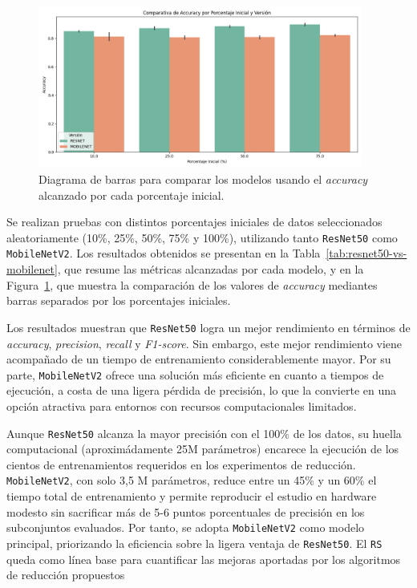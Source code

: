 \begin{figure}[htp]
    \centering
    \includegraphics[width=0.95\textwidth]{imagenes/evaluaciones/comparacion_modelos.png}
    \caption{Diagrama de barras para comparar los modelos usando el \textit{accuracy} alcanzado por cada porcentaje inicial.}
    \label{fig:comparacion_modelos}
\end{figure}

Se realizan pruebas con distintos porcentajes iniciales de datos seleccionados aleatoriamente (10\%, 25\%, 50\%, 75\% y 100\%), utilizando tanto \texttt{ResNet50} como \texttt{MobileNetV2}.
Los resultados obtenidos se presentan en la Tabla~\ref{tab:resnet50-vs-mobilenet}, que resume las métricas alcanzadas por cada modelo,
y en la Figura~\ref{fig:comparacion_modelos}, que muestra la comparación de los valores de \textit{accuracy} mediantes barras separados por los porcentajes iniciales.

Los resultados muestran que \texttt{ResNet50} logra un mejor rendimiento en términos de \textit{accuracy}, \textit{precision}, \textit{recall} y \textit{F1-score}.
Sin embargo, este mejor rendimiento viene acompañado de un tiempo de entrenamiento considerablemente mayor.
Por su parte, \texttt{MobileNetV2} ofrece una solución más eficiente en cuanto a tiempos de ejecución, a costa de una ligera pérdida de precisión,
lo que la convierte en una opción atractiva para entornos con recursos computacionales limitados.

Aunque \texttt{ResNet50} alcanza la mayor precisión con el 100\% de los datos, su huella computacional (aproximádamente 25M parámetros) encarece la ejecución de los cientos de entrenamientos requeridos en los experimentos de reducción.
\texttt{MobileNetV2}, con solo 3,5 M parámetros, reduce entre un 45\% y un 60\% el tiempo total de entrenamiento y
permite reproducir el estudio en hardware modesto sin sacrificar más de 5-6 puntos porcentuales de precisión en los subconjuntos evaluados.
Por tanto, se adopta \texttt{MobileNetV2} como modelo principal, priorizando la eficiencia sobre la ligera ventaja de \texttt{ResNet50}.
El \texttt{RS} queda como línea base para cuantificar las mejoras aportadas por los algoritmos de reducción propuestos


